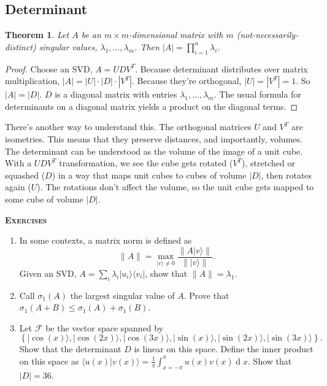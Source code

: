\documentclass{amsbook}
\newtheorem{theorem}{Theorem}
\begin{document}
\subsection{Determinant}

 \begin{theorem}
Let $A$ be an $m\times m$-dimensional matrix with $m$ (not-necessarily-distinct) singular values, $\lambda_1, ..., \lambda_m$.  Then $|A|=\prod_{i=1}^n\lambda_i$.
 \end{theorem}

\begin{proof}
Choose an SVD, $A=UDV^T$.  Because determinant distributes over matrix multiplication, $|A|=|U|\cdot|D|\cdot|V^T|$.  Because they're orthogonal, $|U|=|V^T|=1$.  So $|A|=|D|$.  $D$ is a diagonal matrix with entries $\lambda_1, ..., \lambda_m$.  The usual formula for determinants on a diagonal matrix yields a product on the diagonal terms.
\end{proof}

There's another way to understand this.  The orthogonal matrices $U$ and $V^T$ are isometries.  This means that they preserve distances, and importantly, volumes.  The determinant can be understood as the volume of the image of a unit cube.  With a $UDV^T$ transformation, we see the cube gets rotated ($V^T$), stretched or squashed ($D$) in a way that maps unit cubes to cubes of volume $|D|$, then rotates again ($U$).  The rotations don't affect the volume, so the unit cube gets mapped to some cube of volume $|D|$.

{\bfseries\scshape\Large Exercises}

\begin{enumerate}
\item In some contexts, a matrix norm is defined as 
$$
\|A\|=\max_{|v\rangle\neq0}\frac{\|A|v\rangle\|}{\||v\rangle\|}.
$$
Given an SVD, $A=\sum_i\lambda_i|u_i\rangle\langle v_i|$, show that $\|A\|=\lambda_1$.
\item Call $\sigma_1(A)$ the largest singular value of $A$.  Prove that $\sigma_1(A+B)\leq\sigma_1(A)+\sigma_1(B)$.
\item Let $\mathcal F$ be the vector space spanned by 
$$
\left\{|\cos(x)\rangle, |\cos(2x)\rangle, |\cos(3x)\rangle, |\sin(x)\rangle, |\sin(2x)\rangle, |\sin(3x)\rangle\right\}.
$$
Show that the determinant $D$ is linear on this space.  Define the inner product on this space as $\langle u(x)|v(x)\rangle=\frac{1}{\pi}\int_{x=-\pi}^\pi u(x)v(x)\operatorname{d}x$.  Show that $|D|=36$.
\end{enumerate}
\end{document}

